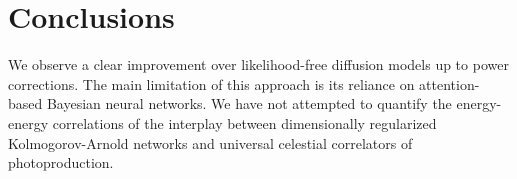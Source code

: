 \section{Conclusions}\label{sec:conclusions}

We observe a clear improvement over likelihood-free diffusion models up
to power corrections. The main limitation of this approach is its
reliance on attention-based Bayesian neural networks. We have not
attempted to quantify the energy-energy correlations of the interplay
between dimensionally regularized Kolmogorov-Arnold networks and
universal celestial correlators of photoproduction.


